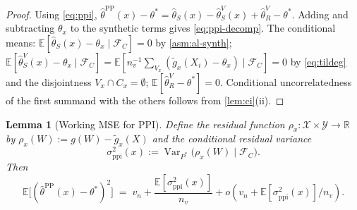 \documentclass[11pt]{article}
\theoremstyle{plain}
\newtheorem{lemma}[theorem]{Lemma}
\theoremstyle{definition}
\theoremstyle{remark}
\newcommand{\R}{\mathbb{R}}
\newcommand{\E}{\mathbb{E}}
\newcommand{\Var}{\operatorname{Var}}
\begin{document}
\begin{proof}
Using \cref{eq:ppi},
$\hat\theta^{\mathrm{PP}}(x)-\theta^*=\hat\theta_S(x)-\hat\theta_S^V(x)+\hat\theta_R^V-\theta^*$.
Adding and subtracting $\theta_x$ to the synthetic terms gives \cref{eq:ppi-decomp}. The conditional means: $\E[\hat\theta_S(x)-\theta_x\mid\mathcal{F}_C]=0$ by \cref{asm:al-synth}; $\E[\hat\theta_S^V(x)-\theta_x\mid\mathcal{F}_C]=\E[n_v^{-1}\sum_{V_x}(\tilde g_x(X_i)-\theta_x)\mid\mathcal{F}_C]=0$ by \cref{eq:tildeg} and the disjointness $V_x\cap C_x=\emptyset$; $\E[\hat\theta_R^V-\theta^*]=0$. Conditional uncorrelatedness of the first summand with the others follows from \cref{lem:ci}(ii).
\end{proof}

\begin{lemma}[Working MSE for PPI]\label{lem:ppi-mse}
Define the residual function $\rho_x:\mathcal{X}\times\mathcal{Y}\to\R$ by $\rho_x(W):=g(W)-\tilde g_x(X)$ and the conditional residual variance
\begin{equation}\label{eq:sigma-ppi}
\sigma_{\mathrm{ppi}}^2(x):=\Var_{P^*}\bigl(\rho_x(W)\mid\mathcal{F}_C\bigr).
\end{equation}
Then
\begin{equation}\label{eq:ppi-mse}
\E\bigl[(\hat\theta^{\mathrm{PP}}(x)-\theta^*)^2\bigr]\;=\;v_n+\frac{\E[\sigma_{\mathrm{ppi}}^2(x)]}{n_v}+o(v_n+\E[\sigma_{\mathrm{ppi}}^2(x)]/n_v).
\end{equation}
\end{lemma}
\end{document}
